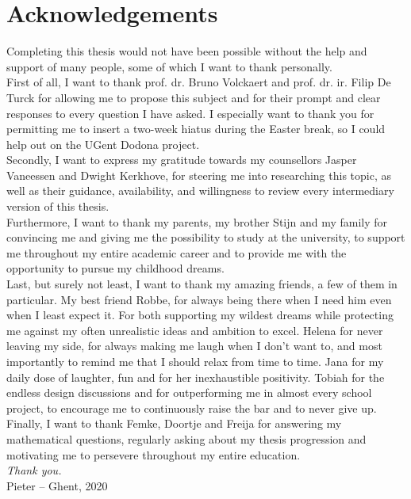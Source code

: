 
\chapter*{Acknowledgements}

Completing this thesis would not have been possible without the help and support of many people, some of which I want to thank personally.\\

\noindent First of all, I want to thank prof. dr. Bruno Volckaert and prof. dr. ir. Filip De Turck for allowing me to propose this subject and for their prompt and clear responses to every question I have asked. I especially want to thank you for permitting me to insert a two-week hiatus during the Easter break, so I could help out on the UGent Dodona project.\\

\noindent Secondly, I want to express my gratitude towards my counsellors Jasper Vaneessen and Dwight Kerkhove, for steering me into researching this topic, as well as their guidance, availability, and willingness to review every intermediary version of this thesis.\\

\noindent Furthermore, I want to thank my parents, my brother Stijn and my family for convincing me and giving me the possibility to study at the university, to support me throughout my entire academic career and to provide me with the opportunity to pursue my childhood dreams.\\

\noindent Last, but surely not least, I want to thank my amazing friends, a few of them in particular. My best friend Robbe, for always being there when I need him even when I least expect it. For both supporting my wildest dreams while protecting me against my often unrealistic ideas and ambition to excel. Helena for never leaving my side, for always making me laugh when I don't want to, and most importantly to remind me that I should relax from time to time. Jana for my daily dose of laughter, fun and for her inexhaustible positivity. Tobiah for the endless design discussions and for outperforming me in almost every school project, to encourage me to continuously raise the bar and to never give up. Finally, I want to thank Femke, Doortje and Freija for answering my mathematical questions, regularly asking about my thesis progression and motivating me to persevere throughout my entire education.\\

\noindent \emph{Thank you.}\\

\noindent Pieter -- Ghent, 2020